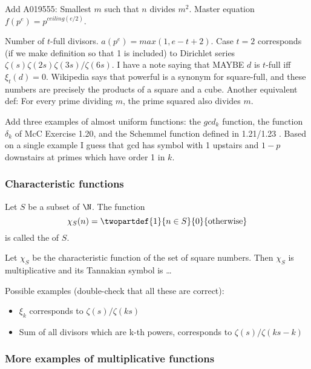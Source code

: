 \begin{example}
Add A019555: Smallest $m$ such that $n$ divides $m^2$. Master equation $f(p^e) = p^{ceiling(e/2)}$.

\end{example}

\begin{example}
Number of $t$-full divisors. $a(p^e) = max(1, e-t+2)$. Case $t=2$ corresponds (if we make definition so that 1 is included) to Dirichlet series $\zeta(s) \zeta(2s) \zeta(3s) / \zeta(6s)$. I have a note saying that MAYBE $d$ is $t$-full iff $\xi_t(d) = 0$. Wikipedia says that powerful is a synonym for square-full, and these numbers are precisely the products of a square and a cube. Another equivalent def: For every prime dividing $m$, the prime squared also divides $m$. 
\end{example}


Add three examples of almost uniform functions: the $gcd_k$ function, the function $\delta_k$ of McC Exercise 1.20, and the Schemmel function defined in 1.21/1.23 . Based on a single example I guess that gcd has symbol with 1 upstairs and $1-p$ downstairs at primes which have order 1 in $k$. 


\subsubsection{Characteristic functions}

\begin{definition}
Let $S$ be a subset of $\N$. The function
$$  \chi_S(n) =  \twopartdef { 1 } { n \in S } {0}  { \textrm{otherwise}} $$
is called the  of $S$.
\end{definition}

\begin{example}
Let $\chi_S$ be the characteristic function of the set of square numbers. Then $\chi_S$ is multiplicative and its Tannakian symbol is \ldots
\end{example}


Possible examples (double-check that all these are correct):
\begin{itemize}
\item $\xi_k$ corresponds to $\zeta(s)/ \zeta(ks)$
\item Sum of all divisors which are k-th powers, corresponds to $\zeta(s) / \zeta(ks-k)$
\end{itemize}

\subsubsection{More examples of multiplicative functions}

